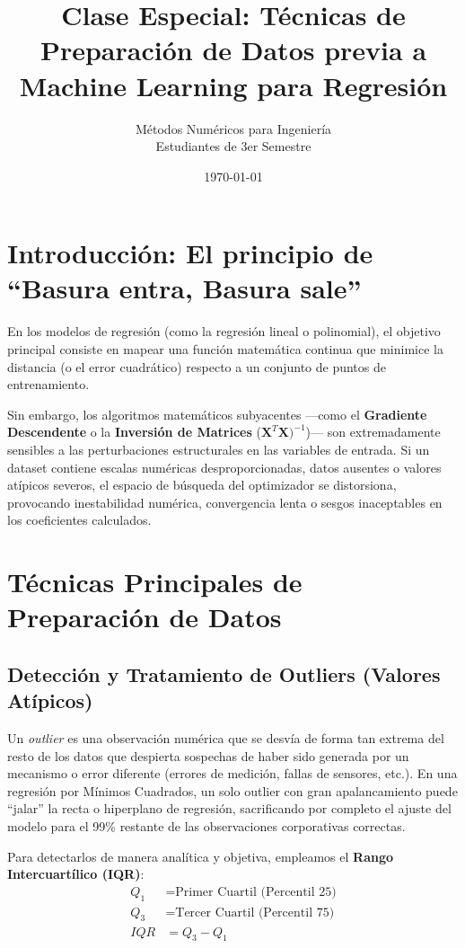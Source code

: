 \documentclass[11pt,a4paper]{article}
\title{\textbf{Clase Especial: Técnicas de Preparación de Datos previa a Machine Learning para Regresión}}
\author{Métodos Numéricos para Ingeniería \\ Estudiantes de 3er Semestre}
\date{\today}
\begin{document}
\maketitle

\tableofcontents
\newpage

\section{Introducción: El principio de ``Basura entra, Basura sale''}
En los modelos de regresión (como la regresión lineal o polinomial), el objetivo principal consiste en mapear una función matemática continua que minimice la distancia (o el error cuadrático) respecto a un conjunto de puntos de entrenamiento. 

Sin embargo, los algoritmos matemáticos subyacentes ---como el \textbf{Gradiente Descendente} o la \textbf{Inversión de Matrices} ($\mathbf{X}^T\mathbf{X})^{-1}$)--- son extremadamente sensibles a las perturbaciones estructurales en las variables de entrada. Si un dataset contiene escalas numéricas desproporcionadas, datos ausentes o valores atípicos severos, el espacio de búsqueda del optimizador se distorsiona, provocando inestabilidad numérica, convergencia lenta o sesgos inaceptables en los coeficientes calculados.

\section{Técnicas Principales de Preparación de Datos}

\subsection{Detección y Tratamiento de Outliers (Valores Atípicos)}
Un \textit{outlier} es una observación numérica que se desvía de forma tan extrema del resto de los datos que despierta sospechas de haber sido generada por un mecanismo o error diferente (errores de medición, fallas de sensores, etc.). En una regresión por Mínimos Cuadrados, un solo outlier con gran apalancamiento puede ``jalar'' la recta o hiperplano de regresión, sacrificando por completo el ajuste del modelo para el 99\% restante de las observaciones corporativas correctas.

Para detectarlos de manera analítica y objetiva, empleamos el \textbf{Rango Intercuartílico (IQR)}:
\begin{align}
    Q_1 &= \text{Primer Cuartil (Percentil 25)} \\
    Q_3 &= \text{Tercer Cuartil (Percentil 75)} \\
    IQR &= Q_3 - Q_1
\end{align}
\end{document}
